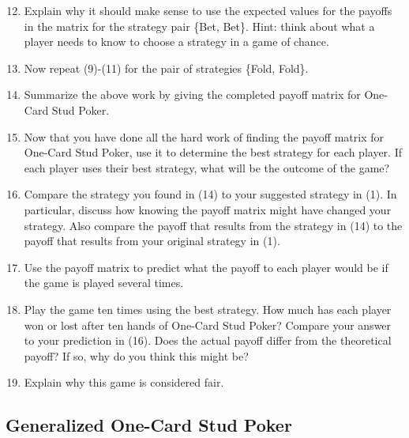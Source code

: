 \begin{enumerate}
\setcounter{enumi}{11}
\item Explain why it should make sense to use the expected values for the payoffs in the matrix for the strategy pair \{Bet, Bet\}. Hint: think about what a player needs to know to choose a strategy in a game of chance.

\item Now repeat (9)-(11) for the pair of strategies \{Fold, Fold\}.

\vspace{.1in}
\item Summarize the above work by giving the completed payoff matrix for One-Card Stud Poker. 

\vspace{.1in}

\item Now that you have done all the hard work of finding the payoff matrix for One-Card Stud Poker, use it to determine the best strategy for each player. If each player uses their best strategy, what will be the outcome of the game?
\vspace{.1in}

\item Compare the strategy you found in (14) to your suggested strategy in (1). In particular, discuss how knowing the payoff matrix might have changed your strategy. Also compare the payoff that results from the strategy in (14) to the payoff that results from your original strategy in (1).
\vspace{.1in}

\item  Use the payoff matrix to predict what the payoff to each player would be if the game is played several times.
\vspace{.1in}

\item Play the game ten times using the best strategy. How much has each player won or lost after ten hands of One-Card Stud Poker? Compare your answer to your prediction in (16). Does the actual payoff differ from the theoretical payoff? If so, why do you think this might be?
\vspace{.1in}

\item Explain why this game is considered fair.
\end{enumerate}

\vspace{.2in}
\subsection{Generalized One-Card Stud Poker}
\vspace{.2in}

